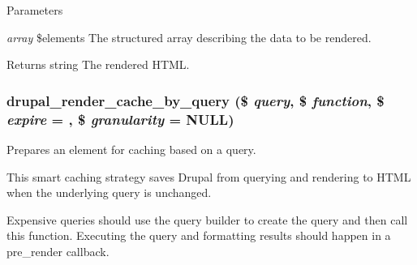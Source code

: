 \begin{DoxyParams}{Parameters}
\item[{\em array}]\$elements The structured array describing the data to be rendered.\end{DoxyParams}
\begin{DoxyReturn}{Returns}
string The rendered HTML. 
\end{DoxyReturn}
\hypertarget{common_8inc_a7ad6a849e842a3c78e25cdd127e5ed0f}{
\subsubsection[{drupal\_\-render\_\-cache\_\-by\_\-query}]{\setlength{\rightskip}{0pt plus 5cm}drupal\_\-render\_\-cache\_\-by\_\-query (\$ {\em query}, \/  \$ {\em function}, \/  \$ {\em expire} = {}, \/  \$ {\em granularity} = {\ttfamily NULL})}}
\label{common_8inc_a7ad6a849e842a3c78e25cdd127e5ed0f}
Prepares an element for caching based on a query.

This smart caching strategy saves Drupal from querying and rendering to HTML when the underlying query is unchanged.

Expensive queries should use the query builder to create the query and then call this function. Executing the query and formatting results should happen in a pre\_\-render callback.


